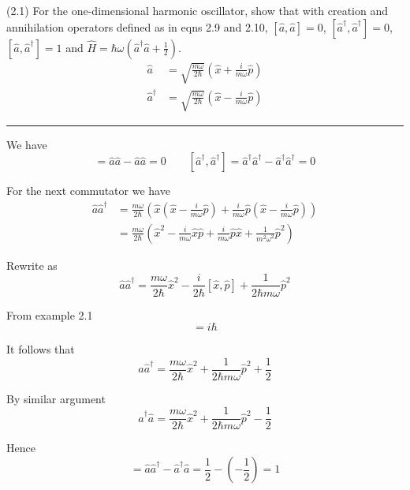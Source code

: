 \documentclass[12pt]{article}
\begin{document}
(2.1)
For the one-dimensional harmonic oscillator, show
that with creation and annihilation operators defined
as in eqns 2.9 and 2.10, $[\hat a,\hat a]=0$,
$[\hat a^\dag,\hat a^\dag]=0$,
$[\hat a,\hat a^\dag]=1$ and
$\hat H=\hbar\omega\left(\hat a^\dag\hat a+\tfrac{1}{2}\right)$.
\begin{align*}
\hat a&=\sqrt{\frac{m\omega}{2\hbar}}
\left(\hat x+\frac{i}{m\omega}\hat p\right)
\tag{2.9}
\\
\hat a^\dag&=\sqrt{\frac{m\omega}{2\hbar}}
\left(\hat x-\frac{i}{m\omega}\hat p\right)
\tag{2.10}
\end{align*}

\bigskip
\hrule

\bigskip
We have
\begin{equation*}
[\hat a,\hat a]=\hat a\hat a-\hat a\hat a=0
\qquad
[\hat a^\dag,\hat a^\dag]=\hat a^\dag\hat a^\dag-\hat a^\dag\hat a^\dag=0
\end{equation*}

For the next commutator we have
\begin{align*}
\hat a\hat a^\dag
&=\frac{m\omega}{2\hbar}
\left(
\hat x\left(\hat x-\frac{i}{m\omega}\hat p\right)
+\frac{i}{m\omega}\hat p\left(\hat x-\frac{i}{m\omega}\hat p\right)
\right)
\\
&=\frac{m\omega}{2\hbar}
\left(
\hat x^2-\frac{i}{m\omega}\hat x\hat p+\frac{i}{m\omega}\hat p\hat x+\frac{1}{m^2\omega^2}\hat p^2\right)
\end{align*}

Rewrite as
\begin{equation*}
\hat a\hat a^\dag
=\frac{m\omega}{2\hbar}\hat x^2-\frac{i}{2\hbar}[\hat x,\hat p]+\frac{1}{2\hbar m\omega}\hat p^2
\end{equation*}

From example 2.1
\begin{equation*}
[\hat x,\hat p]=i\hbar
\end{equation*}

It follows that
\begin{equation*}
\hat a\hat a^\dag
=\frac{m\omega}{2\hbar}\hat x^2+\frac{1}{2\hbar m\omega}\hat p^2+\frac{1}{2}
\tag{1}
\end{equation*}

By similar argument
\begin{equation*}
\hat a^\dag\hat a
=\frac{m\omega}{2\hbar}\hat x^2+\frac{1}{2\hbar m\omega}\hat p^2-\frac{1}{2}
\tag{2}
\end{equation*}

Hence
\begin{equation*}
[\hat a,\hat a^\dag]=\hat a\hat a^\dag-\hat a^\dag\hat a=\frac{1}{2}-\left(-\frac{1}{2}\right)=1
\end{equation*}
\end{document}

